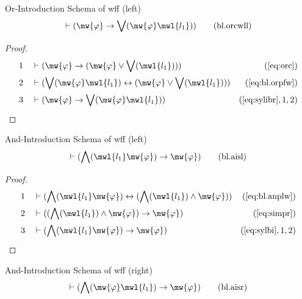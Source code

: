 \begin{lemma} {Or-Introduction Schema of wff (left)}
\begin{align}
\vdash ( \mw{\varphi} \rightarrow \bigvee( \mw{\varphi} \mwl{l_1} )
    )\label{eq:bl.orcwll}\tag{bl.orcwll}
\end{align}
\end{lemma}


\begin{proof}
\begin{align}
  1 &&  & \vdash ( \mw{\varphi} \rightarrow ( \mw{\varphi} \vee \bigvee(
     \mwl{l_1} ) ) )&(\mbox{\ref{eq:orc}})\notag
  \\ 2 &&  & \vdash ( \bigvee( \mw{\varphi} \mwl{l_1} ) \leftrightarrow (
     \mw{\varphi} \vee \bigvee( \mwl{l_1} ) )
     )&(\mbox{\ref{eq:bl.orpfw}})\notag
  \\ 3 &&  & \vdash ( \mw{\varphi} \rightarrow \bigvee( \mw{\varphi} \mwl{l_1}
     ) )&(\mbox{\ref{eq:sylibr}},1,2)\notag
\end{align}
\end{proof}

\begin{lemma} {And-Introduction Schema of wff (left)}
\begin{align}
\vdash ( \bigwedge( \mwl{l_1} \mw{\varphi} ) \rightarrow \mw{\varphi}
    )\label{eq:bl.aisl}\tag{bl.aisl}
\end{align}
\end{lemma}


\begin{proof}
\begin{align}
  1 &&  & \vdash ( \bigwedge( \mwl{l_1} \mw{\varphi} ) \leftrightarrow (
     \bigwedge( \mwl{l_1} ) \wedge \mw{\varphi} )
     )&(\mbox{\ref{eq:bl.anplw}})\notag
  \\ 2 &&  & \vdash ( ( \bigwedge( \mwl{l_1} ) \wedge \mw{\varphi} )
     \rightarrow \mw{\varphi}
     )&(\mbox{\ref{eq:simpr}})\notag
  \\ 3 &&  & \vdash ( \bigwedge( \mwl{l_1} \mw{\varphi} ) \rightarrow
     \mw{\varphi} )&(\mbox{\ref{eq:sylbi}},1,2)\notag
\end{align}
\end{proof}

\begin{lemma} {And-Introduction Schema of wff (right)}
\begin{align}
\vdash ( \bigwedge( \mw{\varphi} \mwl{l_1} ) \rightarrow \mw{\varphi}
    )\label{eq:bl.aisr}\tag{bl.aisr}
\end{align}
\end{lemma}


